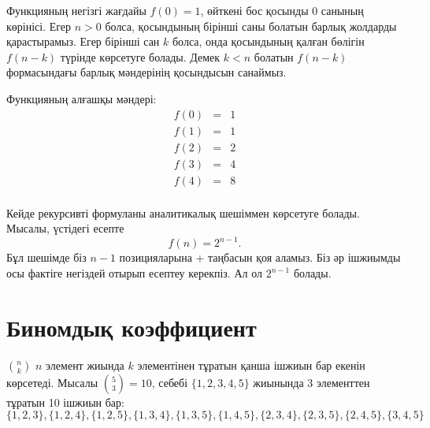 Функцияның негізгі жағдайы $f(0)=1$,
өйткені бос қосынды 0 санының көрінісі. 
Егер $n>0$ болса, қосындының
бірінші саны болатын барлық жолдарды қарастырамыз.
Егер бірінші сан $k$ болса,
онда қосындының қалған бөлігін $f(n-k)$ түрінде
көрсетуге болады. Демек $k<n$ болатын $f(n-k)$ формасындағы
барлық мәндерінің қосындысын санаймыз.  



Функцияның алғашқы мәндері:
\[
\begin{array}{lcl}
f(0) & = & 1 \\
f(1) & = & 1 \\
f(2) & = & 2 \\
f(3) & = & 4 \\
f(4) & = & 8 \\
\end{array}
\]

Кейде рекурсивті формуланы аналитикалық шешіммен
көрсетуге болады.
Мысалы, үстідегі есепте
\[
f(n)=2^{n-1}.
\]
Бұл шешімде біз $n-1$ позицияларына + таңбасын қоя аламыз. 
Біз әр ішжиымды осы фактіге негіздей отырып есептеу керекпіз. 
Ал ол $2^{n-1}$ болады. 

\section{Биномдық коэффициент}


 ${n \choose k}$ 
$n$ элемент жиында $k$ элементінен тұратын қанша ішжиын 
бар екенін көрсетеді. Мысалы ${5 \choose 3}=10$, 
себебі $\{1,2,3,4,5\}$ жиынында 
3 элементтен тұратын 10 ішжиын бар:
\[ \{1,2,3\}, \{1,2,4\}, \{1,2,5\}, \{1,3,4\}, \{1,3,5\}, 
\{1,4,5\}, \{2,3,4\}, \{2,3,5\}, \{2,4,5\}, \{3,4,5\} \]


